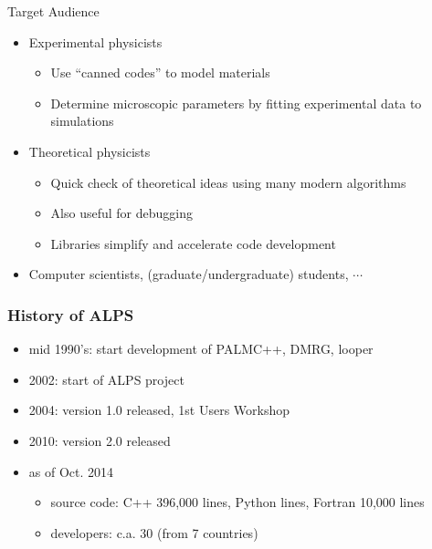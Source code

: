 \begin{frame}{Target Audience}
  \begin{itemize}
    \setlength{\itemsep}{1em}
  \item Experimental physicists
    \begin{itemize}
    \item Use ``canned codes'' to model materials
    \item Determine microscopic parameters by fitting experimental data to simulations
    \end{itemize}
  \item Theoretical physicists
    \begin{itemize}
    \item Quick check of theoretical ideas using many modern algorithms
    \item Also useful for debugging
    \item Libraries simplify and accelerate code development
    \end{itemize}
  \item Computer scientists, (graduate/undergraduate) students, $\cdots$
  \end{itemize}
\end{frame}

\begin{frame}
  \frametitle{History of ALPS}
  \begin{itemize}
  \item mid 1990's: start development of PALMC++, DMRG, looper
  \item 2002: start of ALPS project
  \item 2004: version 1.0 released, 1st Users Workshop
  \item 2010: version 2.0 released
  \item as of Oct. 2014
    \begin{itemize}
      \item source code: C++ 396,000 lines, Python lines, Fortran 10,000 lines
      \item developers: c.a. 30 (from 7 countries)
    \end{itemize}
  \end{itemize}
\end{frame}

